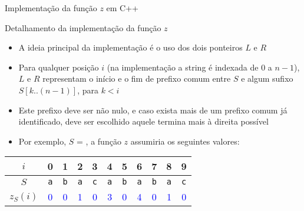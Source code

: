 \begin{frame}[fragile]{Implementação da função $z$ em C++}
\end{frame}

\begin{frame}[fragile]{Detalhamento da implementação da função $z$}

    \begin{itemize}
        \item A ideia principal da implementação é o uso dos dois ponteiros $L$ e $R$
        \pause

        \item Para qualquer posição $i$ (na implementação a string é indexada de $0$ a $n - 1$), 
            $L$ e $R$ representam o início e o fim de prefixo comum 
            entre $S$ e algum sufixo $S[k..(n-1)]$, para $k < i$
        \pause

        \item Este prefixo deve ser não nulo, e caso exista mais de um prefixo comum já 
            identificado, deve ser escolhido aquele termina mais à direita possível
        \pause

        \item Por exemplo, $S$ = , a função $z$ assumiria os seguintes
            valores:


    \end{itemize}

    \begin{center}
        \begin{tabular}{c|cccccccccc}
        $i$ & 0 & 1 & 2 & 3 & 4 & 5 & 6 & 7 & 8 & 9 \\
        \hline
        $S$ & \texttt{\textcolor{red!80!black}{a}} & \texttt{\textcolor{red!80!black}{b}} & \texttt{\textcolor{red!80!black}{a}} & \texttt{\textcolor{red!80!black}{c}} & \texttt{\textcolor{red!80!black}{a}} & \texttt{\textcolor{red!80!black}{b}}
& \texttt{\textcolor{red!80!black}{a}} 
& \texttt{\textcolor{red!80!black}{b}}
& \texttt{\textcolor{red!80!black}{a}}
& \texttt{\textcolor{red!80!black}{c}} \\
        $z_S(i)$ & \textcolor{blue}{0} & \textcolor{blue}{0} & \textcolor{blue}{1} & \textcolor{blue}{0} & \textcolor{blue}{3} & \textcolor{blue}{0}
& \textcolor{blue}{4}
& \textcolor{blue}{0}
& \textcolor{blue}{1}
& \textcolor{blue}{0} \\
        \end{tabular}
    \end{center}


\end{frame}

